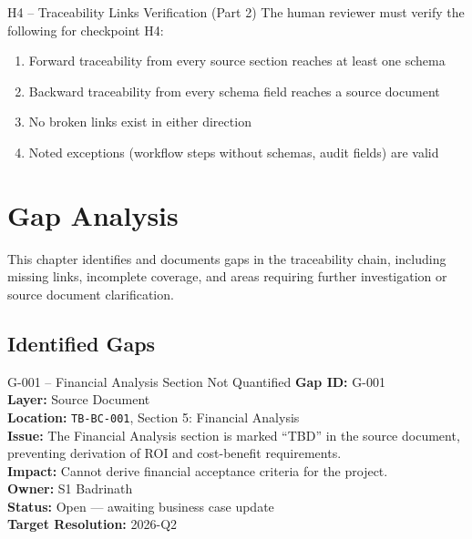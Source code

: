 \documentclass[11pt,a4paper,twoside]{report}
\newcommand{\srcref}[1]{\texttt{#1}}
\begin{document}
\begin{hitlbox}{H4 -- Traceability Links Verification (Part 2)}
The human reviewer must verify the following for checkpoint H4:
\begin{enumerate}[noitemsep]
\item Forward traceability from every source section reaches at least one schema
\item Backward traceability from every schema field reaches a source document
\item No broken links exist in either direction
\item Noted exceptions (workflow steps without schemas, audit fields) are valid
\end{enumerate}
\end{hitlbox}
\chapter{Gap Analysis}
\label{ch:gap-analysis}

This chapter identifies and documents gaps in the traceability chain,
including missing links, incomplete coverage, and areas requiring
further investigation or source document clarification.

\section{Identified Gaps}
\label{sec:identified-gaps}

\begin{gapbox}{G-001 -- Financial Analysis Section Not Quantified}
\textbf{Gap ID:} G-001 \\
\textbf{Layer:} Source Document \\
\textbf{Location:} \srcref{TB-BC-001}, Section 5: Financial Analysis \\
\textbf{Issue:} The Financial Analysis section is marked ``TBD'' in the
source document, preventing derivation of ROI and cost-benefit requirements. \\
\textbf{Impact:} Cannot derive financial acceptance criteria for the project. \\
\textbf{Owner:} S1 Badrinath \\
\textbf{Status:} Open --- awaiting business case update \\
\textbf{Target Resolution:} 2026-Q2
\end{gapbox}
\end{document}
